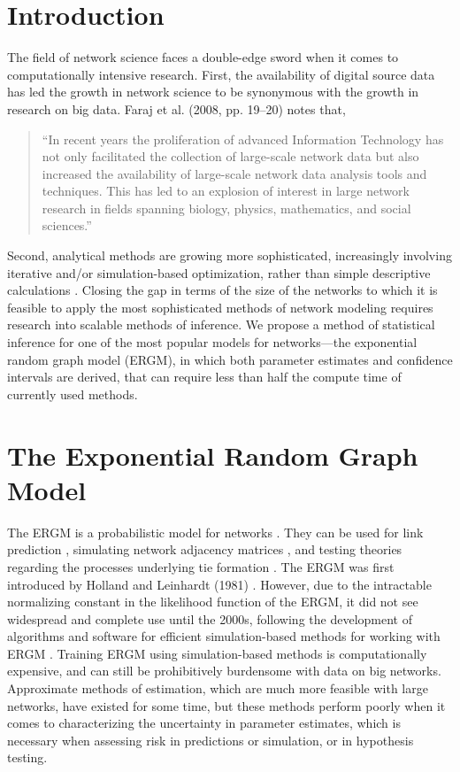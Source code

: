 \documentclass[10pt, conference, compsocconf]{IEEEtran}
\begin{document}
\section{Introduction}
\noindent The field of network science faces a double-edge sword when it comes to computationally intensive research. First, the availability of digital source data has led the growth in network science to be synonymous with the growth in research on big data.  Faraj et al. (2008, pp. 19--20) \cite{faraj2008electronic} notes that, \begin{quote} ``In recent years the proliferation of advanced Information Technology has not only facilitated the collection of large-scale network data but also increased the availability of large-scale network data analysis tools and techniques. This has led to an explosion of interest in large network research in fields spanning biology, physics, mathematics, and social sciences.''  \end{quote} Second, analytical methods are growing more sophisticated, increasingly involving iterative and/or simulation-based optimization, rather than simple descriptive calculations \cite{snijders2011statistical}.  Closing the gap in terms of the size of the networks to which it is feasible to apply the most sophisticated methods of network modeling requires research into scalable methods of inference. We propose a method of statistical inference for one of the most popular models for networks---the exponential random graph model (ERGM), in which both parameter estimates and confidence intervals are derived, that can require less than half the compute time of currently used methods. 

\section{The Exponential Random Graph Model}
\noindent The ERGM is a probabilistic model for networks \cite{chatterjee2013estimating,Wasserman.1996,robins.pattison.2007}. They can be used for link prediction \cite{lu2010supervised}, simulating network adjacency matrices \cite{hackney2006agent}, and testing theories regarding the processes underlying tie formation \cite{goodreau2009birds}. The ERGM was first introduced by Holland and Leinhardt (1981) \cite{holland1981exponential}. However, due to the intractable normalizing constant in the likelihood function of the ERGM, it did not see widespread and complete use until the 2000s, following the development of algorithms and software for efficient simulation-based methods for working with ERGM \cite{snijders2002markov}. Training ERGM using simulation-based methods is computationally expensive, and can still be prohibitively burdensome with data on big networks. Approximate methods of estimation, which are much more feasible with large networks, have existed for some time, but these methods perform poorly when it comes to characterizing the uncertainty in parameter estimates, which is necessary when assessing risk in predictions or simulation, or in hypothesis testing.
\end{document}
